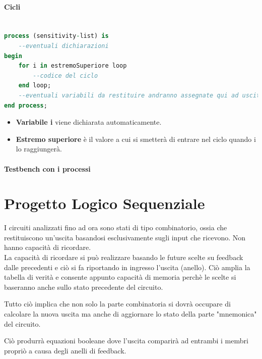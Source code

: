 \documentclass[a4paper]{book}
\begin{document}
\subsubsection{Cicli}


\begin{lstlisting}[language=VHDL]

process (sensitivity-list) is
	--eventuali dichiarazioni
begin 
	for i in estremoSuperiore loop
		--codice del ciclo
	end loop;
	--eventuali variabili da restituire andranno assegnate qui ad uscite o segnali cos' da non essere perse all'uscita dal ciclo.
end process;
\end{lstlisting}

\begin{itemize}

\item\textbf{Variabile i} viene dichiarata automaticamente.

\item\textbf{Estremo superiore} è il valore a cui si smetterà di entrare nel ciclo quando i lo raggiungerà.

\end{itemize}

\subsubsection{Testbench con i processi}

 




\chapter{Progetto Logico Sequenziale}

I circuiti analizzati fino ad ora sono stati di tipo combinatorio, ossia che restituiscono un'uscita basandosi esclusivamente sugli input che ricevono.
Non hanno capacità di ricordare. \\
La capacità di ricordare si può realizzare basando le future scelte su feedback dalle precedenti e ciò si fa riportando in ingresso l'uscita (anello).
Ciò amplia la tabella di verità e consente appunto capacità di memoria perchè le scelte si baseranno anche sullo stato precedente del circuito.

Tutto ciò implica che non solo la parte combinatoria si dovrà occupare di calcolare la nuova uscita ma anche di aggiornare lo stato della parte "mnemonica" del circuito.

Ciò produrrà equazioni booleane dove l'uscita comparirà ad entrambi i membri propriò a causa degli anelli di feedback. 
\end{document}
